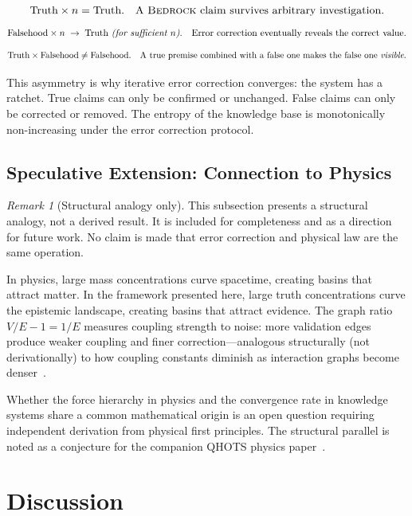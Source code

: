 \documentclass[11pt]{article}
\theoremstyle{definition}
\theoremstyle{remark}
\newtheorem{remark}[theorem]{Remark}
\newcommand{\BEDROCK}{\textsc{Bedrock}}
\begin{document}
\[
  \text{Truth} \times n = \text{Truth.}
  \quad
  \text{A \BEDROCK{} claim survives arbitrary investigation.}
\]
\[
  \text{Falsehood} \times n \;\to\; \text{Truth \emph{(for sufficient~$n$)}.}
  \quad
  \text{Error correction eventually reveals the correct value.}
\]
\[
  \text{Truth} \times \text{Falsehood} \neq \text{Falsehood.}
  \quad
  \text{A true premise combined with a false one makes the false one
  \emph{visible}.}
\]

This asymmetry is why iterative error correction converges: the system has a
ratchet.  True claims can only be confirmed or unchanged.  False claims can only
be corrected or removed.  The entropy of the knowledge base is monotonically
non-increasing under the error correction protocol.

\subsection{Speculative Extension: Connection to Physics}
\label{sec:physics-connection}

\begin{remark}[Structural analogy only]
This subsection presents a structural analogy, not a derived result.  It is
included for completeness and as a direction for future work.  No claim is made
that error correction and physical law are the same operation.
\end{remark}

In physics, large mass concentrations curve spacetime, creating basins that
attract matter.  In the framework presented here, large truth concentrations
curve the epistemic landscape, creating basins that attract evidence.  The graph
ratio $V/E - 1 = 1/E$ measures coupling strength to noise: more validation edges
produce weaker coupling and finer correction---analogous structurally (not
derivationally) to how coupling constants diminish as interaction graphs become
denser~\cite{wilson1975rg}.

Whether the force hierarchy in physics and the convergence rate in knowledge
systems share a common mathematical origin is an open question requiring
independent derivation from physical first principles.  The structural parallel
is noted as a conjecture for the companion QHOTS physics paper~\cite{qhots2026}.

\section{Discussion}
\label{sec:discussion}
\end{document}
